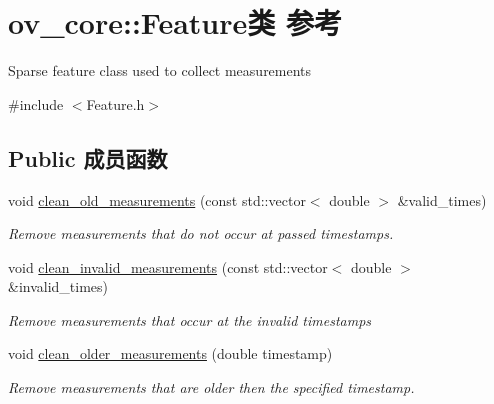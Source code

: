 \hypertarget{classov__core_1_1Feature}{}\section{ov\+\_\+core\+:\+:Feature类 参考}
\label{classov__core_1_1Feature}


Sparse feature class used to collect measurements  




{\ttfamily \#include $<$Feature.\+h$>$}

\subsection*{Public 成员函数}
\begin{DoxyCompactItemize}
\item 
void \hyperlink{classov__core_1_1Feature_aee27e65f3de5581ededd30646479e315}{clean\+\_\+old\+\_\+measurements} (const std\+::vector$<$ double $>$ \&valid\+\_\+times)
\begin{DoxyCompactList}\small\item\em Remove measurements that do not occur at passed timestamps. \end{DoxyCompactList}\item 
void \hyperlink{classov__core_1_1Feature_a9daa91fb3836d23563bdc9aad6686ee1}{clean\+\_\+invalid\+\_\+measurements} (const std\+::vector$<$ double $>$ \&invalid\+\_\+times)
\begin{DoxyCompactList}\small\item\em Remove measurements that occur at the invalid timestamps \end{DoxyCompactList}\item 
void \hyperlink{classov__core_1_1Feature_ad5426e15b7fb0f1f315c12465c63787d}{clean\+\_\+older\+\_\+measurements} (double timestamp)
\begin{DoxyCompactList}\small\item\em Remove measurements that are older then the specified timestamp. \end{DoxyCompactList}\end{DoxyCompactItemize}
